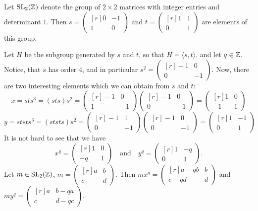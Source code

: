 \begin{solution}
	Let $\mathrm{SL}_2(\mathbb{Z})$ denote the group of $2 \times 2$ matrices with integer entries and determinant $1$. Then $
	s = \begin{pmatrix*}[r]
		0 & -1 \\ 
		1 & 0
	\end{pmatrix*}$ and $
	t = \begin{pmatrix*}[r]
		1 & 1 \\
		0 & 1
	\end{pmatrix*}$ are elements of this group.
	
	Let $H$ be the subgroup generated by $s$ and $t$, so that $H = \langle s, t \rangle$, and let $q \in \mathbb{Z}$. Notice, that $s$ has order $4$, and in particular $s ^ 2 = \begin{pmatrix*}[r]
		-1 & 0 \\
		0 & - 1
	\end{pmatrix*}$. Now, there are two interesting elements which we can obtain from $s$ and $t$:
	\[
		x = s t s^3 = (s t s) s^2 =
		\begin{pmatrix*}[r]
			-1 & 0 \\
			 1  & -1
		\end{pmatrix*}
		\begin{pmatrix*}[r]
			-1 & 0 \\
			0 & -1
		\end{pmatrix*} = 
		\begin{pmatrix*}[r]
			1 & 0 \\
			-1 & 1
		\end{pmatrix*}
	\]
	\[
		y = s t s t s^3 = (s t s t s) s^2 =
		\begin{pmatrix*}[r]
			-1 & 1 \\
			0  & -1
		\end{pmatrix*}
		\begin{pmatrix*}[r]
			-1 & 0 \\
			0 & -1
		\end{pmatrix*} = 
		\begin{pmatrix*}[r]
			1 & -1 \\
			0 & 1
		\end{pmatrix*}
	\]
	It is not hard to see that we have
	\[
		x^q =
		\begin{pmatrix*}[r]
			1 & 0 \\
			-q & 1
		\end{pmatrix*}
		\quad \text{and} \quad
		y^q =
		\begin{pmatrix*}[r]
		1 & -q \\
		0 & 1
		\end{pmatrix*} \text{.}
	\]
	Let $m \in \mathrm{SL}_2(\mathbb{Z})$, $m =
	\begin{pmatrix*}[r]
		a & b \\
		c & d
	\end{pmatrix*}$. 
	Then $m x^q =
	\begin{pmatrix*}[r]
		a - qb & b \\
		c - qd & d
	\end{pmatrix*}$ and $m y^q =
	\begin{pmatrix*}[r]
		a & b - qa \\
		c & d - qc
	\end{pmatrix*}$.
	

\end{solution}
